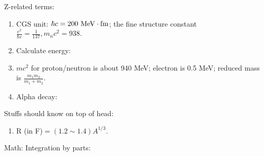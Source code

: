 \documentclass{school-22.101-notes}
\date{December 14, 2011}
\begin{document}
\maketitle



Z-related terms: 
\begin{enumerate}
\item CGS unit: $\hbar c = 200 \mbox{ } \mathrm{MeV} \cdot \mathrm{fm}$; the fine structure constant $\frac{e^2}{\hbar c} = \frac{1}{137}, m_n c^2 = 938.$
\item Calculate energy:
\item $mc^2$ for proton/neutron is about 940 MeV; electron is 0.5 MeV; reduced mass is $\frac{m_1 m_2}{m_1 + m_2}$. 
\item Alpha decay:
\end{enumerate}

Stuffs should know on top of head: 
\begin{enumerate}
\item R (in F)$ = (1.2 \sim 1.4) A^{1/3}.$
\end{enumerate}


Math: 
Integration by parts: 
\end{document}
